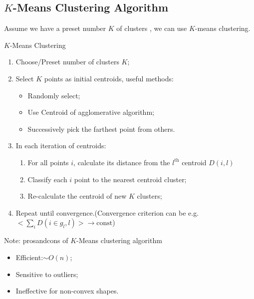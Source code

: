 \subsection{$ K $-Means Clustering Algorithm}
    Assume we have a preset number $ K $ of clusters , we can use $ K $-means clustering.
\begin{algorithm}{$ K $-Means Clustering}
    \begin{enumerate}[topsep=2pt,itemsep=2pt]
        \item Choose/Preset number of clusters $ K $;
        \item Select $ K $ points as initial centroids, useful methods:
        \begin{itemize}[topsep=2pt,itemsep=2pt]
            \item Randomly select;
            \item Use Centroid of agglomerative algorithm;
            \item Successively pick the farthest point from others. 
        \end{itemize}
        \item In each iteration of centroids:
        \begin{enumerate}[topsep=2pt,itemsep=2pt]
            \item For all points $ i $, calculate its distance from the $ l^\mathrm{th} $ centroid $ D(i,l) $
            \item Classify each $ i $ point to the nearest centroid cluster;
            \item Re-calculate the centroid of new $ K $ clusters;
        \end{enumerate}
        \item Repeat until convergence.(Convergence criterion can be e.g. $ <\sum_i D(i\in g_l,l)>\to \mathrm{const} $)
    \end{enumerate}
\end{algorithm}
    





Note: pros­and­cons of $ K $-Means clustering algorithm
\begin{itemize}[topsep=2pt,itemsep=2pt]
    \item Efficient:$ \sim O(n) $;
    \item Sensitive to outliers;
    \item Ineffective for non-convex shapes.
\end{itemize}

